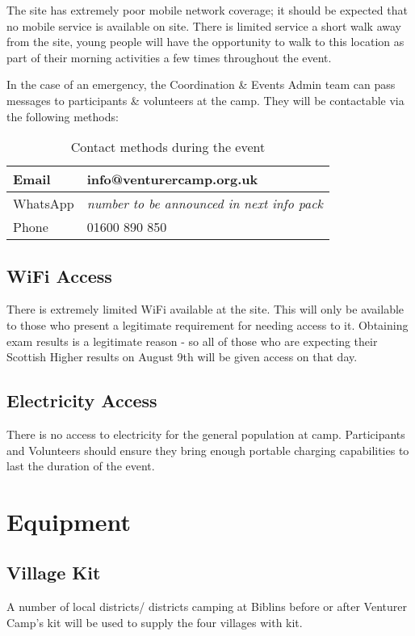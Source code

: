 \documentclass[a4paper, 11pt]{report}
\newcommand{\nl}{\newline}
\begin{document}
The site has extremely poor mobile network coverage; it should be expected that no mobile service is available on site. There is limited service a short walk away from the site, young people will have the opportunity to walk to this location as part of their morning activities a few times throughout the event.\nl

In the case of an emergency, the Coordination \& Events Admin team can pass messages to participants \& volunteers at the camp. They will be contactable via the following methods:
\begin{table}[H]
    \centering
    \begin{tabular}{p{} p{}}
        \hline
        Email & info@venturercamp.org.uk\\
        \hline
        WhatsApp & \textit{number to be announced in next info pack}\\
        \hline
        Phone & 01600 890 850\\
        \hline
    \end{tabular}
    \caption{Contact methods during the event}
\end{table}

\section{WiFi Access}
There is extremely limited WiFi available at the site. This will only be available to those who present a legitimate requirement for needing access to it. Obtaining exam results is a legitimate reason - so all of those who are expecting their Scottish Higher results on August 9th will be given access on that day.

\section{Electricity Access}
There is no access to electricity for the general population at camp. Participants and Volunteers should ensure they bring enough portable charging capabilities to last the duration of the event.

\chapter{Equipment}
\section{Village Kit}
A number of local districts/ districts camping at Biblins before or after Venturer Camp's kit will be used to supply the four villages with kit.\nl
\end{document}
